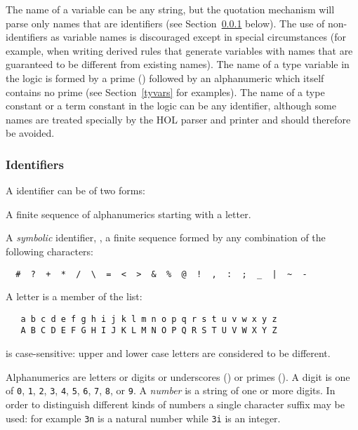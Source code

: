  The name
of a \HOL{} variable
%
%
can be any \ML{} string, but the quotation mechanism will parse only
names that are identifiers (see Section~\ref{ident} below).  The use
of non-identifiers as variable names is discouraged except in special
circumstances (for example, when writing derived rules that generate
variables with names that are guaranteed to be different from existing
names). The name of a type variable
%
%
in the \HOL{} logic is formed by a prime () followed by an
alphanumeric which itself contains no prime (see Section~\ref{tyvars}
for examples).  The name of a type constant or a term constant in the
\HOL{} logic can be any identifier, although some names are treated
specially by the HOL parser and printer and should therefore be
avoided.
%

\subsubsection{Identifiers}\label{ident}

A \HOL{} identifier can be of two forms:
\begin{myenumerate}
\item A finite sequence of alphanumerics starting with a letter.
\item A \emph{symbolic} identifier, \ie, a finite sequence formed by any
combination of the following characters:
\begin{hol}
\begin{verbatim}
  #  ?  +  *  /  \  =  <  >  &  %  @  !  ,  :  ;  _  |  ~  -
\end{verbatim}
\end{hol}
\end{myenumerate}
%
A letter is a member of the list:
%
\begin{hol}
\begin{verbatim}
   a b c d e f g h i j k l m n o p q r s t u v w x y z
   A B C D E F G H I J K L M N O P Q R S T U V W X Y Z
\end{verbatim}
\end{hol}
%
\HOL{} is case-sensitive: upper and lower case letters are
considered to be different.

Alphanumerics are letters or digits or underscores (\ml{\_}) or primes
().  A digit is one of
{\small\verb+0+}, {\small\verb+1+}, {\small\verb+2+}, {\small\verb+3+},
{\small\verb+4+}, {\small\verb+5+}, {\small\verb+6+}, {\small\verb+7+},
{\small\verb+8+}, or {\small\verb+9+}.
A \emph{number} is a string of one or more digits. In order to
distinguish different kinds of numbers a single character suffix may
be used: for example \verb+3n+ is a natural number while \verb+3i+ is
an integer.


